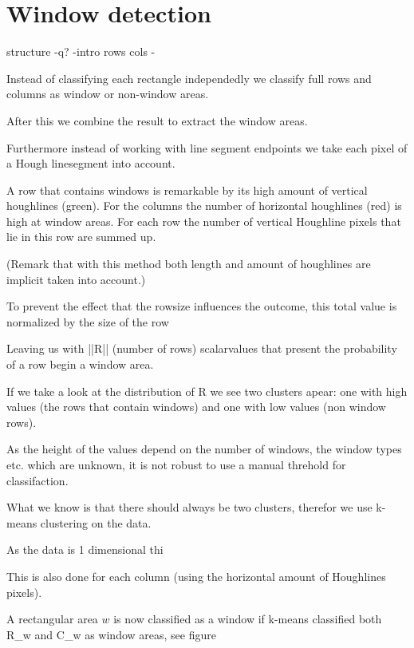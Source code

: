 \section{Window detection}
structure
-q?
-intro rows cols
-

Instead of classifying each rectangle independedly we classify full rows and columns as window or non-window areas.

After this we combine the result to extract the window areas.

Furthermore instead of working with line segment endpoints we take
each pixel of a Hough linesegment into account.

 

 A row that contains windows is remarkable by its high amount of
 vertical houghlines (green). For the columns the number of horizontal houghlines (red) is high at
 window areas.
 For each row the number of vertical Houghline pixels that lie in this row are summed up.

 (Remark that with this method both length and amount of houghlines are
 implicit taken into account.)

 To prevent the effect that the rowsize influences the outcome, this total value is normalized by the size of the row


 Leaving us with ||R|| (number of rows) scalarvalues that present the probability of a row begin a window area.

 If we take a look at the distribution of R we see two clusters apear: one with high values (the rows that contain windows) and one with low values (non window rows).

 As the height of the values depend on the number of windows, the window types etc. which are unknown, it is not robust to use a manual threhold for classifaction.

 What we know is that there should always be two clusters, therefor we use k-means clustering on the data.

 As the data is 1 dimensional thi

 This is also done for each column (using the horizontal amount of Houghlines pixels).

 A rectangular area $w$ is now classified as a window if k-means classified both R_w and C_w as window areas, see figure


  

   

